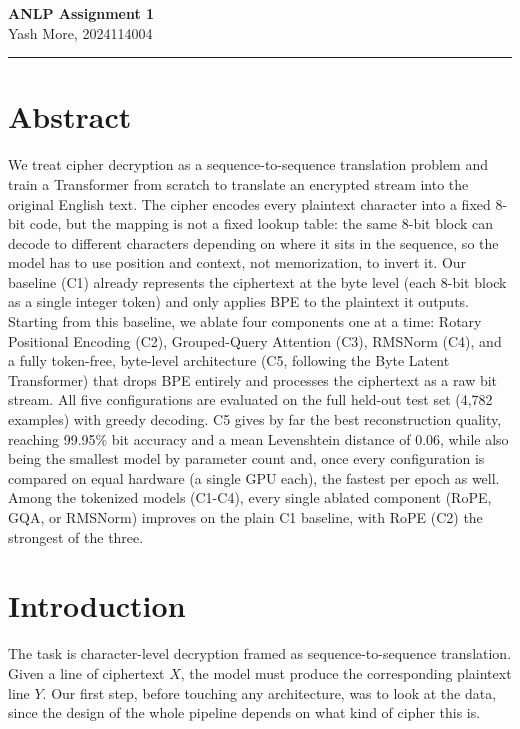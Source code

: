 \documentclass[12pt,a4paper]{article}
\begin{document}
\begin{center}
    {\Large\bfseries ANLP Assignment 1}\\[4pt]
    {\normalsize Yash More, 2024114004}
\end{center}

\vspace{4pt}
\hrule
\vspace{4pt}

\section*{Abstract}

We treat cipher decryption as a sequence-to-sequence translation problem and train a Transformer from scratch to translate an encrypted stream into the original English text. The cipher encodes every plaintext character into a fixed 8-bit code, but the mapping is not a fixed lookup table: the same 8-bit block can decode to different characters depending on where it sits in the sequence, so the model has to use position and context, not memorization, to invert it. Our baseline (C1) already represents the ciphertext at the byte level (each 8-bit block as a single integer token) and only applies BPE to the plaintext it outputs. Starting from this baseline, we ablate four components one at a time: Rotary Positional Encoding (C2), Grouped-Query Attention (C3), RMSNorm (C4), and a fully token-free, byte-level architecture (C5, following the Byte Latent Transformer) that drops BPE entirely and processes the ciphertext as a raw bit stream. All five configurations are evaluated on the full held-out test set (4,782 examples) with greedy decoding. C5 gives by far the best reconstruction quality, reaching 99.95\% bit accuracy and a mean Levenshtein distance of 0.06, while also being the smallest model by parameter count and, once every configuration is compared on equal hardware (a single GPU each), the fastest per epoch as well. Among the tokenized models (C1-C4), every single ablated component (RoPE, GQA, or RMSNorm) improves on the plain C1 baseline, with RoPE (C2) the strongest of the three.

\section{Introduction}

The task is character-level decryption framed as sequence-to-sequence translation. Given a line of ciphertext $X$, the model must produce the corresponding plaintext line $Y$. Our first step, before touching any architecture, was to look at the data, since the design of the whole pipeline depends on what kind of cipher this is.
\end{document}

